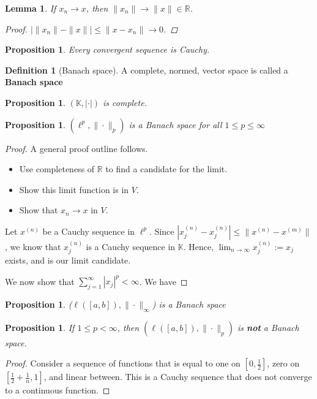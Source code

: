 \documentclass[10pt, oneside, reqno]{amsart}
\theoremstyle{plain}%
\newtheorem{lem}[thm]{Lemma}
\newtheorem{prop}[thm]{Proposition}
\theoremstyle{definition}
\newtheorem{defn}[thm]{Definition}
\theoremstyle{remark}
\newcommand{\R}{\mathbb{R}}
\newcommand{\K}{\mathbb{K}}
\begin{document}
\begin{lem}
	If $x_n \rightarrow x$, then $\| x_n \| \rightarrow \| x \| \in \R$.
	\begin{proof}
		$\left| \| x_n \| - \| x \| \right| \leq \| x - x_n \| \rightarrow 0$.
	\end{proof}
\end{lem}

\begin{prop}
	Every convergent sequence is Cauchy.
\end{prop}

\begin{defn}[Banach space]
A complete, normed, vector space is called a \textbf{Banach space}
\end{defn}

\begin{prop}
	$( \K, |\cdot |)$ is complete.
\end{prop}

\begin{prop}
	$(\ell^p, \| \cdot \|_p)$ is a Banach space for all $1 \leq p \leq \infty$
\end{prop}

\begin{proof}
	A general proof outline follows.
	\begin{itemize}
		\item Use completeness of $\R$ to find a candidate for the limit.
		\item Show this limit function is in $V$.
		\item Show that $x_n \rightarrow x$ in $V$.
 	\end{itemize}
	Let $x^{(n)}$ be a Cauchy sequence in $\ell^p$.  Since $|x_j^{(n)} - x_{j}^{(n)}| \leq \|x^{(n)} - x^{(m)}\|$, we know that $x^{(n)}_j$ is a Cauchy sequence in $\K$.  Hence, $\lim_{n \rightarrow \infty} x^{(n)}_j := x_j$ exists, and is our limit candidate.
	
	We now show that $\sum_{j =1}^\infty |x_j|^p < \infty$.  We have 
\end{proof}

\begin{prop}
	($\ell([a,b]), \|\cdot \|_\infty$) is a Banach space
\end{prop}

\begin{prop}
	If $1 \leq p < \infty$, then $(\ell([a,b]), \| \cdot \|_p)$ is \textbf{not} a Banach space.
\end{prop}
\begin{proof}
	Consider a sequence of functions that is equal to one on $[0, \frac{1}{2}]$, zero on $[\frac{1}{2}+ \frac{1}{n}, 1]$, and linear between.  This is a Cauchy sequence that does not converge to a continuous function. 
\end{proof}
\end{document}
